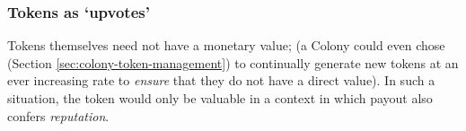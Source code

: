 \subsubsection*{Tokens as `upvotes'}
Tokens themselves need not have a monetary value; (a Colony could even chose (Section \ref{sec:colony-token-management}) to continually generate new tokens at an ever increasing rate to \emph{ensure} that they do not have a direct value). In such a situation, the token would only be valuable in a context in which payout also confers \emph{reputation}.